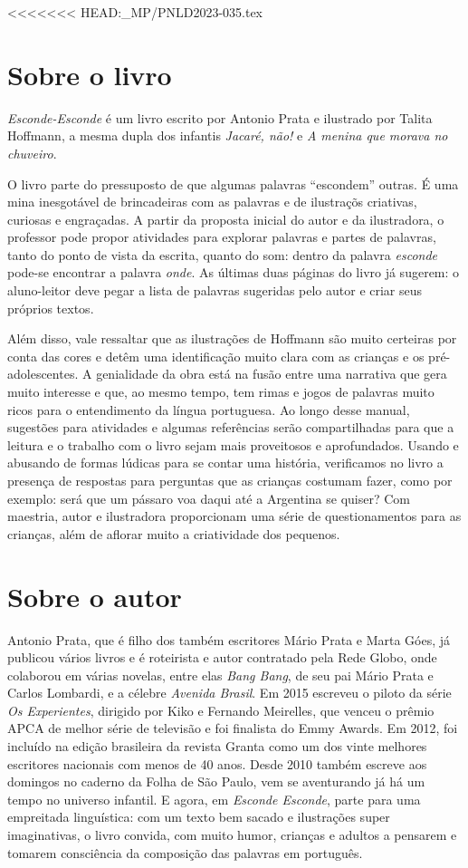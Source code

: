 \documentclass[11pt]{extarticle}
\begin{document}
<<<<<<< HEAD:_MP/PNLD2023-035.tex

\section{Sobre o livro}

\textit{Esconde-Esconde} é um livro escrito por Antonio Prata e ilustrado por Talita Hoffmann, a mesma dupla dos infantis \textit{Jacaré, não!} e \textit{A menina que morava no chuveiro}. 

O livro parte do pressuposto de que algumas palavras “escondem” outras. É uma mina inesgotável de brincadeiras com as palavras e de ilustraçõs criativas, curiosas e engraçadas. A partir da proposta inicial do autor e da ilustradora, o professor pode propor atividades para explorar palavras e partes de palavras, tanto do ponto de vista da escrita, quanto do som: dentro da palavra \textit{esconde} pode-se encontrar a palavra \textit{onde}. As últimas duas páginas do livro já sugerem: o aluno-leitor deve pegar a lista de palavras sugeridas pelo autor e criar seus próprios textos.

Além disso, vale ressaltar que as ilustrações de Hoffmann são muito certeiras por conta das cores e detêm uma identificação muito clara com as crianças e os pré-adolescentes. A genialidade da obra está na fusão entre uma narrativa que gera muito interesse e que, ao mesmo tempo, tem rimas e jogos de palavras muito ricos para o entendimento da língua portuguesa. Ao longo desse manual, sugestões para atividades e algumas referências serão compartilhadas para que a leitura e o trabalho com o livro sejam mais proveitosos e aprofundados. Usando e abusando de formas lúdicas para se contar uma história, verificamos no livro a presença de respostas para perguntas que as crianças costumam fazer, como por exemplo: será que um pássaro voa daqui até a Argentina se quiser? Com maestria, autor e ilustradora proporcionam uma série de questionamentos para as crianças, além de aflorar muito a criatividade dos pequenos.

\section{Sobre o autor}

Antonio Prata, que é  filho dos também escritores Mário Prata e Marta Góes, já publicou vários livros e é roteirista e autor contratado pela Rede Globo, onde colaborou em várias novelas, entre elas \textit{Bang Bang}, de seu pai Mário Prata e Carlos Lombardi, e a célebre \textit{Avenida Brasil}. Em 2015 escreveu o piloto da série \textit{Os Experientes}, dirigido por Kiko e Fernando Meirelles, que venceu o prêmio APCA de melhor série de televisão e foi finalista do Emmy Awards. Em 2012, foi incluído na edição brasileira da revista Granta como um dos vinte melhores escritores nacionais com menos de 40 anos. Desde 2010 também escreve aos domingos no caderno da Folha de São Paulo, vem se aventurando já há um tempo no universo infantil. E agora, em \textit{Esconde Esconde}, parte para uma empreitada linguística: com um texto bem sacado e ilustrações super imaginativas, o livro convida, com muito humor, crianças e adultos a pensarem e tomarem consciência da composição das palavras em português.
\end{document}
